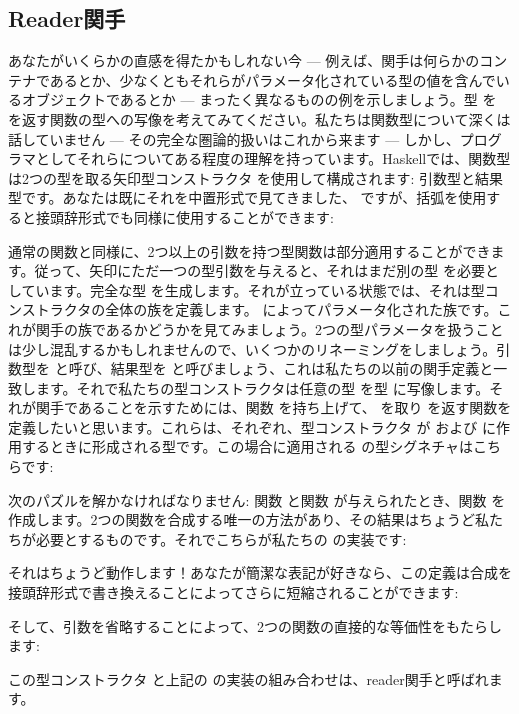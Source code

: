 \subsection{Reader関手}

あなたがいくらかの直感を得たかもしれない今 — 例えば、関手は何らかのコンテナであるとか、少なくともそれらがパラメータ化されている型の値を含んでいるオブジェクトであるとか — まったく異なるものの例を示しましょう。型  を  を返す関数の型への写像を考えてみてください。私たちは関数型について深くは話していません — その完全な圏論的扱いはこれから来ます — しかし、プログラマとしてそれらについてある程度の理解を持っています。Haskellでは、関数型は2つの型を取る矢印型コンストラクタ \code{(->)} を使用して構成されます: 引数型と結果型です。あなたは既にそれを中置形式で見てきました、 ですが、括弧を使用すると接頭辞形式でも同様に使用することができます: 

通常の関数と同様に、2つ以上の引数を持つ型関数は部分適用することができます。従って、矢印にただ一つの型引数を与えると、それはまだ別の型  を必要としています。完全な型  を生成します。それが立っている状態では、それは型コンストラクタの全体の族を定義します。 によってパラメータ化された族です。これが関手の族であるかどうかを見てみましょう。2つの型パラメータを扱うことは少し混乱するかもしれませんので、いくつかのリネーミングをしましょう。引数型を  と呼び、結果型を  と呼びましょう、これは私たちの以前の関手定義と一致します。それで私たちの型コンストラクタは任意の型  を型  に写像します。それが関手であることを示すためには、関数  を持ち上げて、 を取り  を返す関数を定義したいと思います。これらは、それぞれ、型コンストラクタ  が  および  に作用するときに形成される型です。この場合に適用される  の型シグネチャはこちらです: 

次のパズルを解かなければなりません: 関数  と関数  が与えられたとき、関数  を作成します。2つの関数を合成する唯一の方法があり、その結果はちょうど私たちが必要とするものです。それでこちらが私たちの  の実装です: 

それはちょうど動作します！あなたが簡潔な表記が好きなら、この定義は合成を接頭辞形式で書き換えることによってさらに短縮されることができます: 

そして、引数を省略することによって、2つの関数の直接的な等価性をもたらします: 

この型コンストラクタ  と上記の  の実装の組み合わせは、reader関手と呼ばれます。

